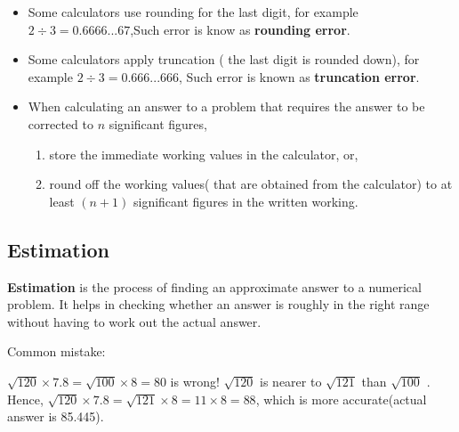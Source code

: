 \documentclass[../main]{subfiles}
\begin{document}
\begin{itemize}
\item Some calculators use rounding for the last digit, for example \( 2 \div 3
  = 0.6666...67 \),Such error is know as \textbf{rounding error}.
\item Some calculators apply truncation ( the last digit is rounded down), for
  example \(2 \div 3 = 0.666...666\), Such error is known as \textbf{truncation
    error}.
 
\item When calculating an answer to a problem that requires the answer to be
  corrected to \(n\) significant figures,

  \begin{enumerate}
  \item store the immediate working values in the calculator, or,
   
  \item round off the working values( that are obtained from the calculator) to
    at least \((n +1)\) significant figures in the written working.
  \end{enumerate}
\end{itemize}


\subsection{Estimation}

\textbf{Estimation} is the process of finding an approximate answer to a
numerical problem. It helps in checking whether an answer is roughly in the
right range without having to work out the actual answer.

Common mistake:

\(\sqrt {120} \times 7.8 = \sqrt {100} \times 8 = 80 \) is wrong! \(\sqrt {120}\) is nearer
to \(\sqrt {121}\) than \(\sqrt {100}\) . Hence, \(\sqrt {120} \times 7.8 = \sqrt {121} \times 8 =
11 \times 8 = 88 \), which is more accurate(actual answer is 85.445).
\end{document}
